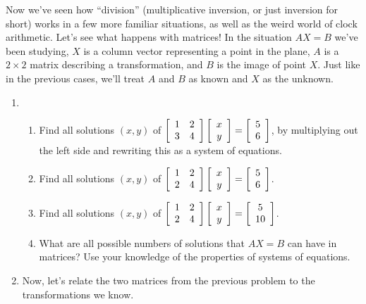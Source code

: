 \documentclass[../gatm.tex]{subfiles}
\begin{document}
\noindent Now we've seen how ``division'' (multiplicative inversion, or just inversion for short) works in a few more familiar situations, as well as the weird world of clock arithmetic. Let's see what happens with matrices! In the situation $AX=B$ we've been studying, $X$ is a column vector representing a point in the plane, $A$ is a $2\times 2$ matrix describing a transformation, and $B$ is the image of point $X$. Just like in the previous cases, we'll treat $A$ and $B$ as known and $X$ as the unknown.

\begin{enumerate}
\setcounter{enumi}{\value{problem_i}}
\item \begin{enumerate}
\item \label{prob:needed_for_matrix_undo3}Find all solutions $(x,y)$ of $\left[\begin{array}{cc} 1 & 2 \\ 3 & 4 \end{array}\right]\left[\begin{array}{c} x \\ y \end{array}\right]=\left[\begin{array}{c} 5 \\ 6 \end{array}\right]$, by multiplying out the left side and rewriting this as a system of equations.
\item \label{prob:needed_for_matrix_undo4}Find all solutions $(x,y)$ of $\left[\begin{array}{cc} 1 & 2 \\ 2 & 4 \end{array}\right]\left[\begin{array}{c} x \\ y \end{array}\right]=\left[\begin{array}{c} 5 \\ 6 \end{array}\right]$.
\item Find all solutions $(x,y)$ of $\left[\begin{array}{cc} 1 & 2 \\ 2 & 4 \end{array}\right]\left[\begin{array}{c} x \\ y \end{array}\right]=\left[\begin{array}{c} 5 \\ 10 \end{array}\right]$.
\item What are all possible numbers of solutions that $AX=B$ can have in matrices? Use your knowledge of the properties of systems of equations.
\end{enumerate}
\item Now, let's relate the two matrices from the previous problem to the transformations we know.
\begin{enumerate}

\end{enumerate}
\end{enumerate}
\end{document}
